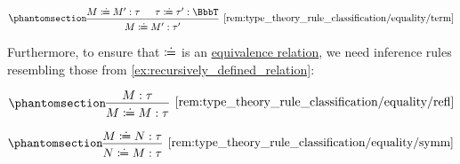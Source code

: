 \begin{remark}
\begin{thmenum}
\begin{paracol}{2}
      \begin{rightcolumn}
        \ParacolAlignmentHack
        \begin{equation*}\taglabel[\ensuremath{ \coloneqq_{\logic{term}} }]{rem:type_theory_rule_classification/equality/term}
          \begin{prooftree}
            \hypo{ M \syndefeq M': \tau }
            \hypo{ \tau \syndefeq \tau': \BbbT }
            \infer2[\ref{rem:type_theory_rule_classification/equality/term}]{ M \syndefeq M': \tau' }
          \end{prooftree}
        \end{equation*}
      \end{rightcolumn}
    \end{paracol}

    Furthermore, to ensure that \( {\syndefeq} \) is an \hyperref[def:equivalence_relation]{equivalence relation}, we need inference rules resembling those from \cref{ex:recursively_defined_relation}:
    \begin{paracol}{3}
      \begin{nthcolumn}{0}
        \ParacolAlignmentHack
        \begin{equation*}\taglabel[\ensuremath{ \coloneqq_{\logic{refl}} }]{rem:type_theory_rule_classification/equality/refl}
          \begin{prooftree}
            \hypo{ M: \tau }
            \infer1[\ref{rem:type_theory_rule_classification/equality/refl}]{ M \syndefeq M: \tau }
          \end{prooftree}
        \end{equation*}
      \end{nthcolumn}

      \begin{nthcolumn}{1}
        \ParacolAlignmentHack
        \begin{equation*}\taglabel[\ensuremath{ \coloneqq_{\logic{symm}} }]{rem:type_theory_rule_classification/equality/symm}
          \begin{prooftree}
            \hypo{ M \syndefeq N: \tau }
            \infer1[\ref{rem:type_theory_rule_classification/equality/symm}]{ N \syndefeq M: \tau }
          \end{prooftree}
        \end{equation*}
      \end{nthcolumn}


\end{paracol}
\end{thmenum}
\end{remark}
